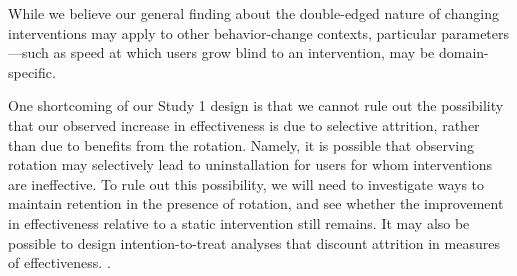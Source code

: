 While we believe our general finding about the double-edged nature of changing interventions may apply to other behavior-change contexts, particular parameters---such as speed at which users grow blind to an intervention, may be domain-specific.

One shortcoming of our Study 1 design is that we cannot rule out the possibility that our observed increase in effectiveness is due to selective attrition, rather than due to benefits from the rotation. Namely, it is possible that observing rotation may selectively lead to uninstallation for users for whom interventions are ineffective. To rule out this possibility, we will need to investigate ways to maintain retention in the presence of rotation, and see whether the improvement in effectiveness relative to a static intervention still remains. It may also be possible to design intention-to-treat analyses that discount attrition in measures of effectiveness. .



